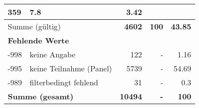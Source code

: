 \begin{longtable}{lXrrr}
       \num{359} &
       \num[round-mode=places,round-precision=2]{7.8} &
         \num[round-mode=places,round-precision=2]{3.42} \\
     \midrule
     \multicolumn{2}{l}{Summe (gültig)} &
       \textbf{\num{4602}} &
     \textbf{\num{100}} &
       \textbf{\num[round-mode=places,round-precision=2]{43.85}} \\
     \multicolumn{5}{l}{\textbf{Fehlende Werte}}\\
       -998 &
       keine Angabe &
         \num{122} &
        - &
         \num[round-mode=places,round-precision=2]{1.16} \\
       -995 &
       keine Teilnahme (Panel) &
         \num{5739} &
        - &
         \num[round-mode=places,round-precision=2]{54.69} \\
       -989 &
       filterbedingt fehlend &
         \num{31} &
        - &
         \num[round-mode=places,round-precision=2]{0.3} \\
     \midrule
     \multicolumn{2}{l}{\textbf{Summe (gesamt)}} &
          \textbf{\num{10494}} &
        \textbf{-} &
        \textbf{\num{100}} \\
     \bottomrule
     \end{longtable}
     
